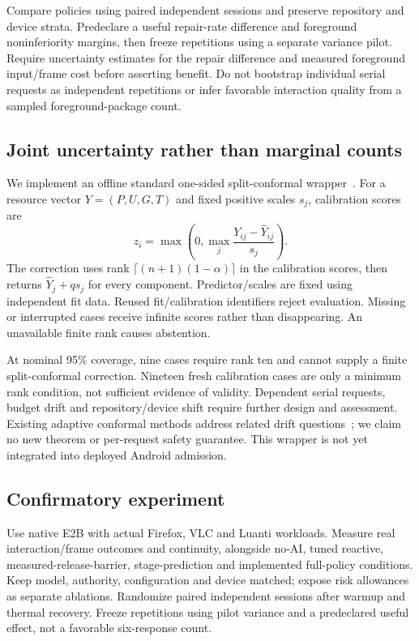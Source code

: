 \documentclass[10pt,twocolumn]{article}
\begin{document}
Compare policies using paired independent sessions and preserve repository and
device strata. Predeclare a useful repair-rate difference and foreground
noninferiority margins, then freeze repetitions using a separate variance
pilot. Require uncertainty estimates for the repair difference and measured
foreground input/frame cost before asserting benefit. Do not bootstrap individual
serial requests as independent repetitions or infer favorable interaction
quality from a sampled foreground-package count.

\subsection{Joint uncertainty rather than marginal counts}
We implement an offline standard one-sided split-conformal wrapper~\cite{conformal}.
For a resource vector $Y=(P,U,G,T)$ and fixed positive scales $s_j$, calibration
scores are
\begin{equation}
 z_i=\max\left(0,\max_j\frac{Y_{ij}-\widehat Y_{ij}}{s_j}\right).
\end{equation}
The correction uses rank $\lceil(n+1)(1-\alpha)\rceil$ in the calibration scores,
then returns $\widehat Y_j+q s_j$ for every component. Predictor/scales are fixed
using independent fit data. Reused fit/calibration identifiers reject evaluation.
Missing or interrupted cases receive infinite scores rather than disappearing.
An unavailable finite rank causes abstention.

At nominal 95\% coverage, nine cases require rank ten and cannot supply a finite
split-conformal correction. Nineteen fresh calibration cases are only a minimum
rank condition, not sufficient evidence of validity. Dependent serial requests,
budget drift and repository/device shift require further design and assessment.
Existing adaptive conformal methods address related drift questions~\cite{aci};
we claim no new theorem or per-request safety guarantee. This wrapper is not yet
integrated into deployed Android admission.

\subsection{Confirmatory experiment}
Use native E2B with actual Firefox, VLC and Luanti workloads. Measure real
interaction/frame outcomes and continuity, alongside no-AI, tuned reactive,
measured-release-barrier, stage-prediction and implemented full-policy conditions.
Keep model, authority, configuration and device matched; expose risk allowances
as separate ablations. Randomize paired independent sessions after warmup and
thermal recovery. Freeze repetitions using pilot variance and a predeclared
useful effect, not a favorable six-response count.
\end{document}
